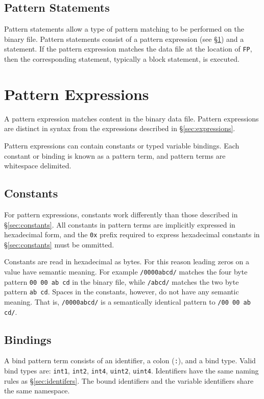 \documentclass[letterpaper]{article}
\begin{document}
\subsection{Pattern Statements}
Pattern statements allow a type of pattern matching to be performed on the binary file.  Pattern statements consist of a pattern expression (see \S\ref{sec:pattern-expressions}) and a statement.  If the pattern expression matches the data file at the location of \texttt{FP}, then the corresponding statement, typically a block statement, is executed.

\section{Pattern Expressions}
\label{sec:pattern-expressions}
A pattern expression matches content in the binary data file.  Pattern expressions are distinct in syntax from the expressions described in \S\ref{sec:expressions}.

Pattern expressions can contain constants or typed variable bindings.  Each constant or binding is known as a pattern term, and pattern terms are whitespace delimited.

\subsection{Constants}
\label{sec:pattern-constants}
For pattern expressions, constants work differently than those described in \S\ref{sec:constants}.  All constants in pattern terms are implicitly expressed in hexadecimal form, and the \texttt{0x} prefix required to express hexadecimal constants in \S\ref{sec:constants} must be ommitted.

Constants are read in hexadecimal as bytes.  For this reason leading zeros on a value have semantic meaning.  For example \texttt{/0000abcd/} matches the four byte pattern \texttt{00 00 ab cd} in the binary file, while \texttt{/abcd/} matches the two byte pattern \texttt{ab cd}.  Spaces in the constants, however, do not have any semantic meaning.  That is, \texttt{/0000abcd/} is a semantically identical pattern to \texttt{/00 00 ab cd/}.
 
\subsection{Bindings}
A bind pattern term consists of an identifier, a colon (\texttt{:}), and a bind type.  Valid bind types are: \texttt{int1}, \texttt{int2}, \texttt{int4}, \texttt{uint2}, \texttt{uint4}.  Identifiers have the same naming rules as \S\ref{sec:identifers}.  The bound identifiers and the variable identifiers share the same namespace.
\end{document}
